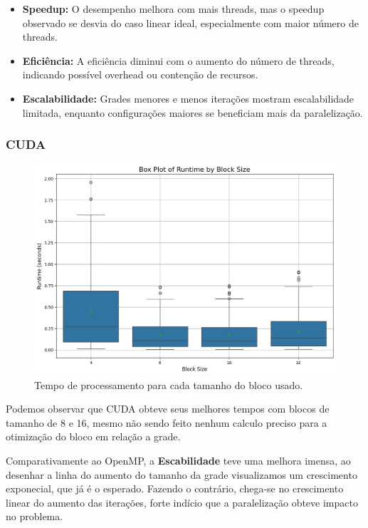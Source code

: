 \begin{itemize}
    \item \textbf{Speedup:} O desempenho melhora com mais threads, mas o speedup observado se desvia do caso linear ideal, especialmente com maior número de threads.
    \item \textbf{Eficiência:} A eficiência diminui com o aumento do número de threads, indicando possível overhead ou contenção de recursos.
    \item \textbf{Escalabilidade:} Grades menores e menos iterações mostram escalabilidade limitada, enquanto configurações maiores se beneficiam mais da paralelização.
\end{itemize}

\subsubsection{CUDA}

\begin{figure}[H]
    \centering
    \includegraphics[width=1\linewidth]{assets/RunTime_Grid_CUDA.jpg}
    \caption{Tempo de processamento para cada tamanho do bloco usado.}
    \label{fig:Runtimexblock}
\end{figure}
Podemos observar que CUDA obteve seus melhores tempos com blocos de tamanho de 8 e 16, mesmo não sendo feito nenhum calculo preciso para a otimização do bloco em relação a grade.

Comparativamente ao OpenMP, a \textbf{Escabilidade} teve uma melhora imensa, ao desenhar a linha do aumento do tamanho da grade visualizamos um crescimento exponecial, que já é o esperado. Fazendo o contrário, chega-se no crescimento linear do aumento das iterações, forte indício que a paralelização obteve impacto no problema.

